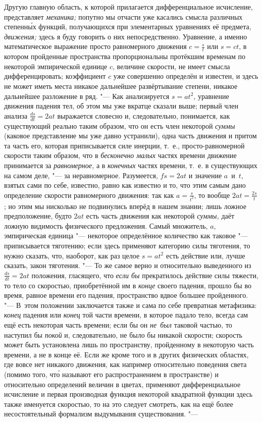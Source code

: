 Другую главную область, к которой прилагается дифференциальное исчисление,
представляет {\em механика;} попутно мы отчасти уже касались смысла различных
степенн\'{ы}х функций, получающихся при элементарных уравнениях её предмета,
{\em движения;} здесь я буду говорить о них непосредственно. Уравнение, а
именно математическое выражение просто равномерного движения $c=\frac s t$ или
$s=ct$, в котором пройденные пространства пропорциональны протёкшим временам по
некоторой эмпирической единице $c$, величине скорости, не имеет смысла
дифференцировать; коэффициент $c$ уже совершенно определён и известен, и здесь не
может иметь места никакое дальнейшее развёртывание степени, никакое дальнейшее
разложение в ряд. "--- Как анализируется $s=at^2$, уравнение движения падения
тел, об этом мы уже вкратце сказали выше; первый член анализа
$\frac{ds}{dt}=2at$ выражается словесно и, следовательно, понимается, как
существующий реально таким образом, что он есть член некоторой {\em суммы}
(каковое представление мы уже давно устранили), одна часть движения и притом та
часть его, которая приписывается силе инерции, т.~е., просто-равномерной
скорости таким образом, что в {\em бесконечно малых} частях времени движение
принимается за {\em равномерное,} а в {\em конечных} частях времени, т.~е. в
существующих на самом деле, "--- за неравномерное. Разумеется, $fs=2at$ и
значение $a$~и~$t$, взятых сами по себе, известно, равно как известно и то, что
этим самым дано определение скорости равномерного движения: так как $a=\frac
s{t^2}$, то вообще $2at=\frac{2s} t$; но этим мы нисколько не подвинулись
вперёд в нашем знании; лишь ложное предположение, будто $2at$ есть часть
движения как некоторой {\em суммы,} даёт ложную видимость физического
предложения. Самый множитель, $a$, эмпирическая единица "--- некоторое
определённое количество как таковое "--- приписывается тяготению; если здесь
применяют категорию силы тяготения, то нужно сказать, что, наоборот, как раз
целое $s=at^2$ есть действие или, лучше сказать, закон тяготения. "--- То же
самое верно и относительно выведенного из $\frac{ds}{dt}=2at$ положения,
гласящего, что {\em если бы} прекратилось действие силы тяжести, то тело со
скоростью, приобретённой им в {\em конце} своего падения, прошло бы во время,
равное времени его падения, пространство вдвое большее пройденного. "--- В~этом
положении заключается также и сама по себе превратная метафизика: {\em конец}
падения или {\em конец} той части времени, в которое падало тело, всегда сам
ещё есть некоторая часть времени; если бы он {\em не~был} таковой частью, то
наступил бы {\em покой} и, следовательно, не было бы никакой скорости; скорость
может быть установлена лишь по пространству, пройденному в некоторую часть
времени, а не в конце её. Если же кроме того и в других физических областях,
где вовсе нет никакого движения, как например относительно поведения света
(помимо того, чт\'{о} называют его распространением в пространстве) и относительно
определений величин в цветах, применяют дифференциальное исчисление и первая
производная функция некоторой квадратной функции здесь также именуется
скоростью, то на это следует смотреть, как на ещё более несостоятельный
формализм выдумывания существования. "---

